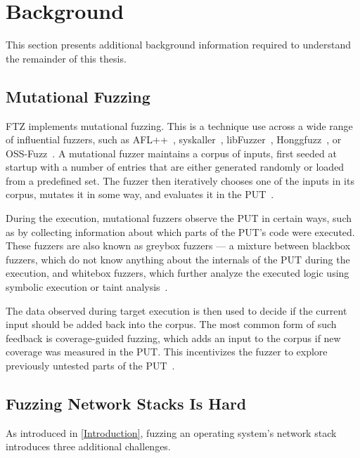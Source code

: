 \documentclass[twocolumn]{article}
\newcommand{\proj}{FTZ\xspace}
\let\savedCite=\cite
\renewcommand{\cite}{\unskip~\savedCite}
\begin{document}

\section{Background}
\label{Background}

This section presents additional background information required to understand the remainder of this thesis.

\subsection{Mutational Fuzzing}

\label{Background:MutationalFuzzing}
\proj implements mutational fuzzing. This is a technique use across a wide range of influential fuzzers, such as AFL++\cite{AFLPlusPlus}, syskaller\cite{syskaller}, libFuzzer\cite{libFuzzer}, Honggfuzz\cite{hongfuzz}, or OSS-Fuzz\cite{OSSFuzz}. A mutational fuzzer maintains a corpus of inputs, first seeded at startup with a number of entries that are either generated randomly or loaded from a predefined set. The fuzzer then iteratively chooses one of the inputs in its corpus, mutates it in some way, and evaluates it in the PUT\cite{FuzzingBook}.

During the execution, mutational fuzzers observe the PUT in certain ways, such as by collecting information about which parts of the PUT's code were executed. These fuzzers are also known as greybox fuzzers — a mixture between blackbox fuzzers, which do not know anything about the internals of the PUT during the execution, and whitebox fuzzers, which further analyze the executed logic using symbolic execution or taint analysis\cite{Demystifying}.

The data observed during target execution is then used to decide if the current input should be added back into the corpus. The most common form of such feedback is coverage-guided fuzzing, which adds an input to the corpus if new coverage was measured in the PUT. This incentivizes the fuzzer to explore previously untested parts of the PUT\cite{AFLPlusPlus}.

\subsection{Fuzzing Network Stacks Is Hard}
\label{Background:FuzzingNetworkStacksIsHard}

As introduced in \cref{Introduction}, fuzzing an operating system's network stack introduces three additional challenges.
\end{document}
